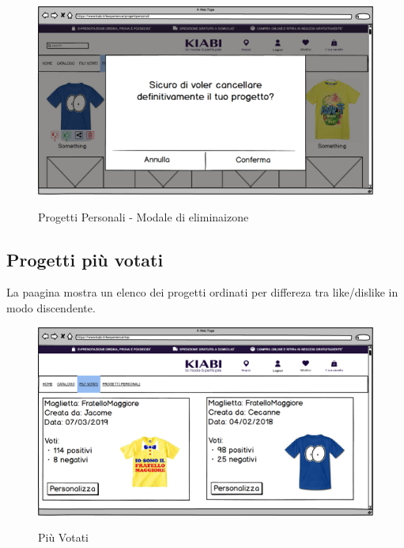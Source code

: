 \documentclass[12pt,italian,]{report}
\begin{document}
\begin{figure}[h]
\centering
\includegraphics{balsamiq/Progetti Personali eliminazione.png}
\label{progetti_personali_delete}
\caption{Progetti Personali - Modale di eliminaizone}
\end{figure}



\subsection{Progetti più votati} 



La paagina mostra un elenco dei progetti ordinati per differeza tra like/dislike in modo discendente.


\begin{figure}[h]
\centering
\includegraphics{balsamiq/Most Rated.png}
\label{piu_votati}
\caption{Più Votati}
\end{figure}
\end{document}

